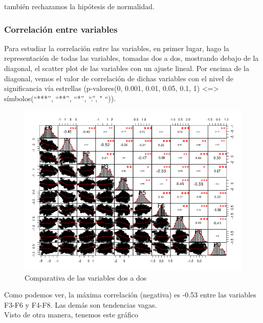 también rechazamos la hipótesis de normalidad.

\subsubsection{Correlación entre variables}

Para estudiar la correlación entre las variables, en primer lugar, hago la representación de todas las variables, tomadas dos a dos, mostrando debajo de la diagonal, el scatter plot de las variables con un ajuste lineal. Por encima de la diagonal, vemos el valor de correlación de dichas variables con el nivel de significancia vía estrellas (p-valores(0, 0.001, 0.01, 0.05, 0.1, 1) <=> símbolos(“***”, “**”, “*”, “.”, " “)).

\begin{figure}[H] %
	\centering
	\includegraphics[scale=0.8]{plot-vowel.png}  %
	\caption{Comparativa de las variables dos a dos} 
	\label{fig:plot-vowel}
\end{figure}

Como podemos ver, la máxima correlación (negativa) es -0.53 entre las variables F3-F6 y F4-F8. Las demás son tendencias vagas. \\

Visto de otra manera, tenemos este gráfico

